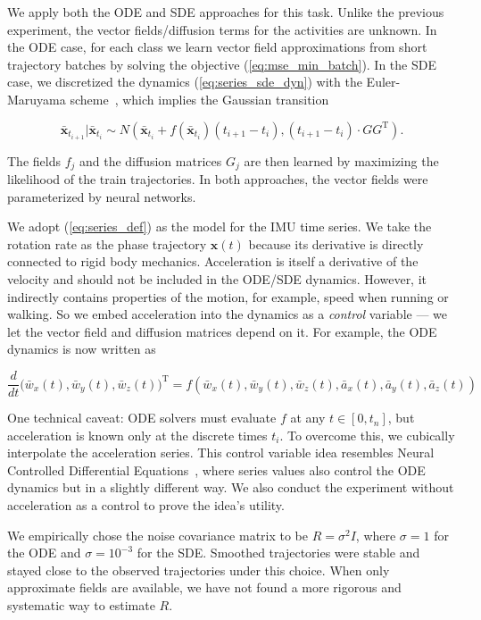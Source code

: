 \documentclass[referee, pdflatex, sn-mathphys-num]{sn-jnl}
\theoremstyle{definition}
\theoremstyle{plain}
\newcommand{\bx}{\ensuremath{\mathbf{x}}}
\newcommand{\bbx}{\ensuremath{\bar{\mathbf{x}}}}
\begin{document}
	We apply both the ODE and SDE approaches for this task. Unlike the previous experiment, the vector fields/diffusion terms for the activities are unknown. In the ODE case, for each class we learn vector field approximations from short trajectory batches by solving the objective (\ref{eq:mse_min_batch}). In the SDE case, we discretized the dynamics (\ref{eq:series_sde_dyn}) with the Euler-Maruyama scheme~\cite{Maruyama1955ContinuousMP}, which implies the Gaussian transition
	
	\begin{equation*}
		\bbx_{t_{i+1}} | \bbx_{t_{i}} \sim N(\bbx_{t_{i}}+ f(\bbx_{t_{i}}) (t_{i+1} - t_i),  (t_{i+1} - t_i) \cdot G G^{\text{T}}).
	\end{equation*}
	
	The fields $f_j$ and the diffusion matrices $G_j$ are then learned by maximizing the likelihood of the train trajectories. In both approaches, the vector fields were parameterized by neural networks.
	
	We adopt (\ref{eq:series_def}) as the model for the IMU time series. We take the rotation rate as the phase trajectory $\bx(t)$ because its derivative is directly connected to rigid body mechanics. Acceleration is itself a derivative of the velocity and should not be included in the ODE/SDE dynamics. However, it indirectly contains properties of the motion, for example, speed when running or walking. So we embed acceleration into the dynamics as a \emph{control} variable --- we let the vector field and diffusion matrices depend on it. For example, the ODE dynamics is now written as
	
	\begin{equation*}
		\frac{d}{dt} \big( \bar{w}_x(t), \bar{w}_y(t), \bar{w}_z(t) \big)^{\text{T}} = f(\bar{w}_x(t), \bar{w}_y(t), \bar{w}_z(t), \bar{a}_x(t), \bar{a}_y(t), \bar{a}_z(t))
	\end{equation*}
	
	One technical caveat: ODE solvers must evaluate $f$ at any $t \in [0, t_n]$, but acceleration is known only at the discrete times $t_i$. To overcome this, we cubically interpolate the acceleration series. This control variable idea resembles Neural Controlled Differential Equations~\cite{kidger2020neural}, where series values also control the ODE dynamics but in a slightly different way. We also conduct the experiment without acceleration as a control to prove the idea's utility.
	
	We empirically chose the noise covariance matrix to be $ R = \sigma^2 I$, where $\sigma = 1$ for the ODE and $\sigma = 10^{-3}$ for the SDE. Smoothed trajectories were stable and stayed close to the observed trajectories under this choice. When only approximate fields are available, we have not found a more rigorous and systematic way to estimate $R$.
	
\end{document}
